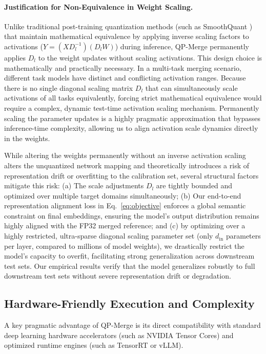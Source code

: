 \paragraph{Justification for Non-Equivalence in Weight Scaling.}
Unlike traditional post-training quantization methods (such as SmoothQuant \cite{xiao2023smoothquant}) that maintain mathematical equivalence by applying inverse scaling factors to activations ($Y = (X D_l^{-1}) (D_l W)$) during inference, QP-Merge permanently applies $D_l$ to the weight updates without scaling activations. This design choice is mathematically and practically necessary. In a multi-task merging scenario, different task models have distinct and conflicting activation ranges. Because there is no single diagonal scaling matrix $D_l$ that can simultaneously scale activations of all tasks equivalently, forcing strict mathematical equivalence would require a complex, dynamic test-time activation scaling mechanism. Permanently scaling the parameter updates is a highly pragmatic approximation that bypasses inference-time complexity, allowing us to align activation scale dynamics directly in the weights. 

While altering the weights permanently without an inverse activation scaling alters the unquantized network mapping and theoretically introduces a risk of representation drift or overfitting to the calibration set, several structural factors mitigate this risk: (a) The scale adjustments $D_l$ are tightly bounded and optimized over multiple target domains simultaneously; (b) Our end-to-end representation alignment loss in Eq.~\ref{eq:objective} enforces a global semantic constraint on final embeddings, ensuring the model's output distribution remains highly aligned with the FP32 merged reference; and (c) by optimizing over a highly restricted, ultra-sparse diagonal scaling parameter set (only $d_{\text{in}}$ parameters per layer, compared to millions of model weights), we drastically restrict the model's capacity to overfit, facilitating strong generalization across downstream test sets. Our empirical results verify that the model generalizes robustly to full downstream test sets without severe representation drift or degradation.

\subsection{Hardware-Friendly Execution and Complexity}
A key pragmatic advantage of QP-Merge is its direct compatibility with standard deep learning hardware accelerators (such as NVIDIA Tensor Cores) and optimized runtime engines (such as TensorRT or vLLM). 

